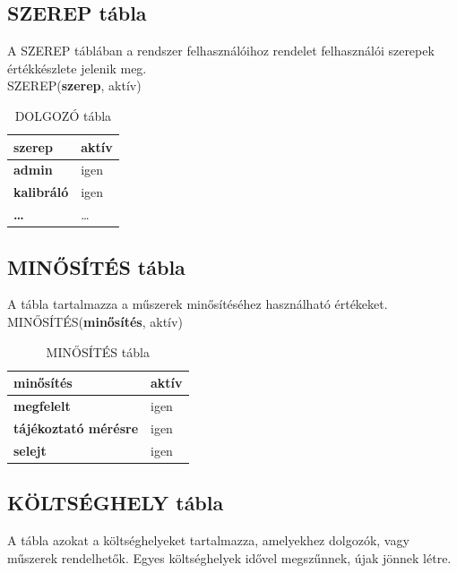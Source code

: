 \documentclass[a4paper,12pt]{report}
\newcommand{\pk}[1]{\textbf{#1}} %
\newcommand{\tabla}[1]{\noindent\MakeUppercase{#1}} %
\begin{document}
\subsection{SZEREP tábla}
A \tabla{szerep} táblában a rendszer felhasználóihoz rendelet felhasználói 
szerepek értékkészlete jelenik meg.\\

\tabla{SZEREP}(\pk{szerep}, aktív)

\begin{table}[ht!]
\centering
{\footnotesize \begin{tabular}[t]{|l|l|}
\hline
 \textbf{szerep}&aktív\\\hline
 \textbf{admin}&igen\\
 \textbf{kalibráló}&igen\\
 \textbf{\dots}&\dots\\
\end{tabular}}
\caption{DOLGOZÓ tábla} \label{tabSZEREP}
\end{table}


\subsection{MINŐSÍTÉS tábla}
A tábla tartalmazza a műszerek minősítéséhez használható értékeket.\\

\tabla{MINŐSÍTÉS}(\pk{minősítés}, aktív)
\begin{table}[ht!]
\centering
\begin{footnotesize}
\begin{tabular}[t]{|l|l|}
\hline
 \textbf{minősítés}&aktív\\\hline
 \textbf{megfelelt}&igen\\
 \textbf{tájékoztató mérésre}&igen\\
 \textbf{selejt}&igen\\
 \hline
\end{tabular}
\end{footnotesize}
\caption{MINŐSÍTÉS tábla} \label{tabMINOSITES}
\end{table}


\subsection{KÖLTSÉGHELY tábla}
A tábla azokat a költséghelyeket tartalmazza, amelyekhez dolgozók, vagy 
műszerek rendelhetők. Egyes költséghelyek idővel megszűnnek, újak jönnek
létre.\\
\end{document}

